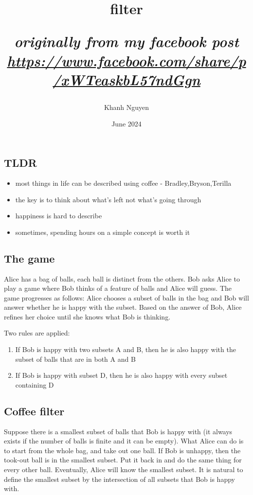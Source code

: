 \documentclass{article}
\title{
filter \\
\begin{large} 
  \textit{originally from my facebook post \url{https://www.facebook.com/share/p/xWTeaskbL57ndGgn}}
\end{large}
}
\author{Khanh Nguyen}
\date{June 2024}
\begin{document}
\maketitle

\subsection{TLDR}

\begin{itemize}
    \item most things in life can be described using coffee - Bradley,Bryson,Terilla
    \item the key is to think about what's left not what's going through
    \item happiness is hard to describe
    \item sometimes, spending hours on a simple concept is worth it
\end{itemize}

\subsection{The game}

Alice has a bag of balls, each ball is distinct from the others. Bob asks Alice to play a game where Bob thinks of a feature of balls and Alice will guess. The game progresses as follows: Alice chooses a subset of balls in the bag and Bob will answer whether he is happy with the subset. Based on the answer of Bob, Alice refines her choice until she knows what Bob is thinking.

Two rules are applied:
\begin{enumerate}
    \item If Bob is happy with two subsets A and B, then he is also happy with the subset of balls that are in both A and B
    \item If Bob is happy with subset D, then he is also happy with every subset containing D
\end{enumerate}

\subsection{Coffee filter}
Suppose there is a smallest subset of balls that Bob is happy with (it always exists if the number of balls is finite and it can be empty). What Alice can do is to start from the whole bag, and take out one ball. If Bob is unhappy, then the took-out ball is in the smallest subset. Put it back in and do the same thing for every other ball. Eventually, Alice will know the smallest subset. It is natural to define the smallest subset by the intersection of all subsets that Bob is happy with.
\end{document}
